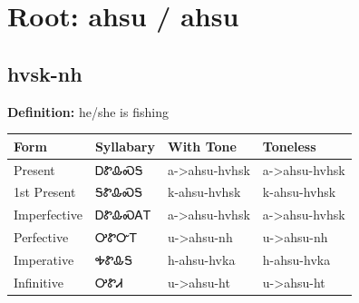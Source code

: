 \documentclass{article}%
\begin{document}
%
\normalsize%
\section*{Root: ahsu / ahsu}%
\subsection*{hvsk-nh}%
\textbf{Definition: }%
he/she is fishing%
\\[0.5em]%
\begin{tabular}{|l|l|l|l|}%
\hline%
\textbf{Form}&\textbf{Syllabary}&\textbf{With Tone}&\textbf{Toneless}\\%
\hline%
Present&ᎠᏑᎲᏍᎦ&a{-}>ahsu{-}hvhsk&a{-}>ahsu{-}hvhsk\\%
1st Present&ᎦᏑᎲᏍᎦ&k{-}ahsu{-}hvhsk&k{-}ahsu{-}hvhsk\\%
Imperfective&ᎠᏑᎲᏍᎪᎢ&a{-}>ahsu{-}hvhsk&a{-}>ahsu{-}hvhsk\\%
Perfective&ᎤᏑᏅᎢ&u{-}>ahsu{-}nh&u{-}>ahsu{-}nh\\%
Imperative&ᎭᏑᎲᎦ&h{-}ahsu{-}hvka&h{-}ahsu{-}hvka\\%
Infinitive&ᎤᏑᏗ&u{-}>ahsu{-}ht&u{-}>ahsu{-}ht\\%
\hline%
\end{tabular}%
\\[1em]%
\end{document}
